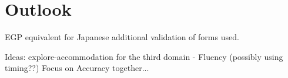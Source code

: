 \chapter{Outlook}
%
EGP equivalent for Japanese additional validation of forms used.

Ideas: explore-accommodation for the third domain - Fluency (possibly using timing??)  Focus on Accuracy together...